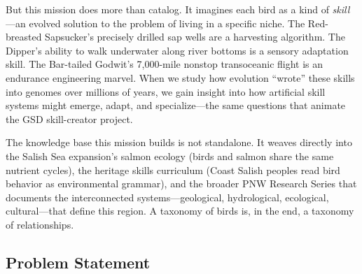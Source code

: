 \documentclass[11pt,letterpaper]{article}
\begin{document}
But this mission does more than catalog. It imagines each bird as a kind of \textit{skill}---an evolved solution to the problem of living in a specific niche. The Red-breasted Sapsucker's precisely drilled sap wells are a harvesting algorithm. The Dipper's ability to walk underwater along river bottoms is a sensory adaptation skill. The Bar-tailed Godwit's 7,000-mile nonstop transoceanic flight is an endurance engineering marvel. When we study how evolution ``wrote'' these skills into genomes over millions of years, we gain insight into how artificial skill systems might emerge, adapt, and specialize---the same questions that animate the GSD skill-creator project.

The knowledge base this mission builds is not standalone. It weaves directly into the Salish Sea expansion's salmon ecology (birds and salmon share the same nutrient cycles), the heritage skills curriculum (Coast Salish peoples read bird behavior as environmental grammar), and the broader PNW Research Series that documents the interconnected systems---geological, hydrological, ecological, cultural---that define this region. A taxonomy of birds is, in the end, a taxonomy of relationships.

\subsection{Problem Statement}
\end{document}
